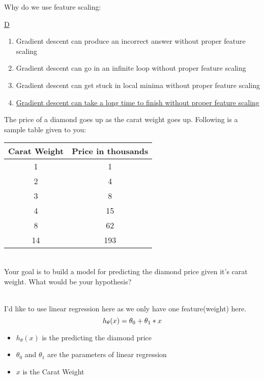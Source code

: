\documentclass[a4paper]{article}
\begin{document}
\begin{enumerate}
    {\bf\item Why do we use feature scaling:}\underline{D}

        \begin{enumerate}[label=(\Alph*)]
            \item Gradient descent can produce an incorrect answer without proper feature scaling
            \item Gradient descent can go in an infinite loop without proper feature scaling
            \item Gradient descent can get stuck in local minima without proper feature scaling
            \item \underline{Gradient descent can take a long time to finish without proper feature scaling}
        \end{enumerate}

    {\bf\item The price of a diamond goes up as the carat weight goes up. Following is a sample table given to you:

        \begin{tabular}{|c | c|} 
            \hline
            Carat Weight & Price in thousands \\
            \hline
            1 & 1 \\
            \hline
            2 & 4 \\
            \hline
            3 & 8 \\
            \hline
            4 & 15 \\
            \hline
            8 & 62 \\
            \hline
            14 & 193\\
            \hline
        \end{tabular}\\
        Your goal is to build a model for predicting the diamond price given it's carat weight. What would be your hypothesis?}\\
        I'd like to use linear regression here as we only have one feature(weight) here.\\
        $$
            h_\theta(x) = \theta_0 + \theta_1 * x\\
        $$
        \begin{itemize}
            \item $h_\theta(x)$ is the predicting the diamond price
            \item $\theta_0$ and $\theta_1$ are the parameters of linear regression
            \item $x$ is the Carat Weight
        \end{itemize}

\end{enumerate}
\end{document}
